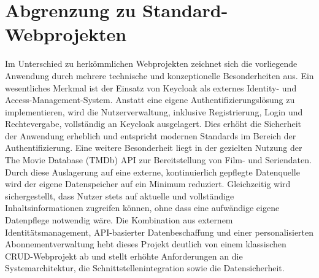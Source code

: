 \section{Abgrenzung zu Standard-Webprojekten}
Im Unterschied zu herkömmlichen Webprojekten zeichnet sich die vorliegende Anwendung durch mehrere technische und konzeptionelle Besonderheiten aus.
Ein wesentliches Merkmal ist der Einsatz von Keycloak als externes Identity- und Access-Management-System. Anstatt eine eigene Authentifizierungslösung zu implementieren, wird die Nutzerverwaltung, inklusive Registrierung, Login und Rechtevergabe, vollständig an Keycloak ausgelagert. Dies erhöht die Sicherheit der Anwendung erheblich und entspricht modernen Standards im Bereich der Authentifizierung.
Eine weitere Besonderheit liegt in der gezielten Nutzung der The Movie Database (TMDb) API zur Bereitstellung von Film- und Seriendaten. Durch diese Auslagerung auf eine externe, kontinuierlich gepflegte Datenquelle wird der eigene Datenspeicher auf ein Minimum reduziert. Gleichzeitig wird sichergestellt, dass Nutzer stets auf aktuelle und vollständige Inhaltsinformationen zugreifen können, ohne dass eine aufwändige eigene Datenpflege notwendig wäre.
Die Kombination aus externem Identitätsmanagement, API-basierter Datenbeschaffung und einer personalisierten Abonnementverwaltung hebt dieses Projekt deutlich von einem klassischen CRUD-Webprojekt ab und stellt erhöhte Anforderungen an die Systemarchitektur, die Schnittstellenintegration sowie die Datensicherheit.